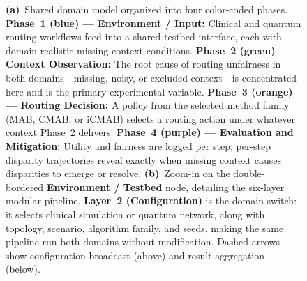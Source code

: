 \documentclass{IEEEtran}
\begin{document}
\begin{figure}[!t]
{%
}

\caption{%
  \textbf{(a)}~Shared domain model organized into four color-coded phases.
  \textcolor{phase1blue}{\textbf{Phase~1 (blue) --- Environment / Input:}}
    Clinical and quantum routing workflows feed into a shared testbed interface,
    each with domain-realistic missing-context conditions.
  \textcolor{phase2green}{\textbf{Phase~2 (green) --- Context Observation:}}
    The root cause of routing unfairness in both domains---missing, noisy, or
    excluded context---is concentrated here and is the primary experimental variable.
  \textcolor{phase3orange}{\textbf{Phase~3 (orange) --- Routing Decision:}}
    A policy from the selected method family (MAB, CMAB, or iCMAB) selects a
    routing action under whatever context Phase~2 delivers.
  \textcolor{phase4purple}{\textbf{Phase~4 (purple) --- Evaluation and Mitigation:}}
    Utility and fairness are logged per step; per-step disparity trajectories
    reveal exactly when missing context causes disparities to emerge or resolve.
  \textbf{(b)}~Zoom-in on the double-bordered \textcolor{phase1blue}{\textbf{Environment / Testbed}}
    node, detailing the six-layer modular pipeline.
  \textbf{Layer~2 (Configuration)} is the domain switch: it selects clinical simulation
    or quantum network, along with topology, scenario, algorithm family, and seeds,
    making the same pipeline run both domains without modification.
  Dashed arrows show configuration broadcast (above) and result aggregation (below).}
\label{fig:domain_model}
\end{figure}
\end{document}
